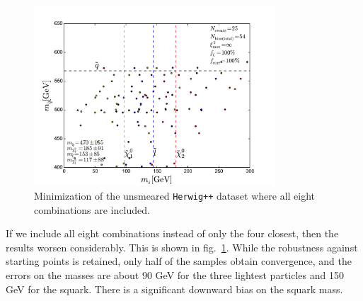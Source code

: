 \documentclass[twoside,english]{uiofysmaster}
\begin{document}
\begin{figure}[hbt]
	\centering
	\includegraphics[width=0.8\textwidth]{figures/improving_combinatorics/herwigpp-8combosum-fit-nosmear-nocut.pdf} 	
	\caption{Minimization of the unsmeared {\tt Herwig++} dataset where all eight combinations are included.}
	\label{fig:8combosum-nosmear}
\end{figure}
If we include all eight combinations instead of only the four closest, then the results worsen considerably. This is shown in fig.\ \ref{fig:8combosum-nosmear}. While the robustness against starting points is retained, only half of the samples obtain convergence, and the errors on the masses are about 90 GeV for the three lightest particles and 150 GeV for the squark. There is a significant downward bias on the squark mass.
\end{document}
